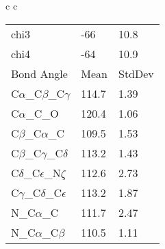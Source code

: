 \begin{longtable}{ c c }
\begin{tabular}{ l l l }
  chi3 & -66 & 10.8 \\ 
  chi4 & -64 & 10.9 \\ \midrule
  Bond Angle   & Mean     & StdDev \\ \midrule
  C$\alpha$\_C$\beta$\_C$\gamma$ & 114.7 & 1.39\\
  C$\alpha$\_C\_O & 120.4 & 1.06\\
  C$\beta$\_C$\alpha$\_C & 109.5 & 1.53\\
  C$\beta$\_C$\gamma$\_C$\delta$ & 113.2 & 1.43\\
  C$\delta$\_C$\epsilon$\_N$\zeta$ & 112.6 & 2.73\\
  C$\gamma$\_C$\delta$\_C$\epsilon$ & 113.2 & 1.87\\
  N\_C$\alpha$\_C & 111.7 & 2.47\\
  N\_C$\alpha$\_C$\beta$ & 110.5 & 1.11\\
  \bottomrule
  \end{tabular}
  \\
  
\end{longtable}

\newpage
